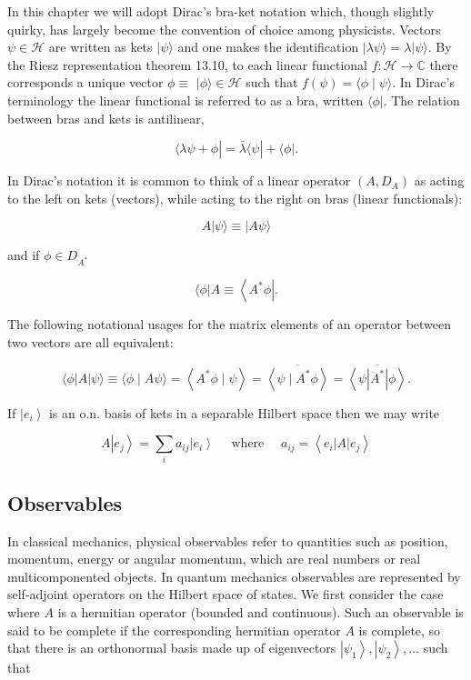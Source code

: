 \documentclass[10pt]{article}
\begin{document}
In this chapter we will adopt Dirac's bra-ket notation which, though slightly quirky, has largely become the convention of choice among physicists. Vectors $\psi \in \mathcal{H}$ are written as kets $|\psi\rangle$ and one makes the identification $|\lambda \psi\rangle=\lambda|\psi\rangle$. By the Riesz representation theorem 13.10, to each linear functional $f: \mathcal{H} \rightarrow \mathbb{C}$ there corresponds a unique vector $\phi \equiv$ $|\phi\rangle \in \mathcal{H}$ such that $f(\psi)=\langle\phi \mid \psi\rangle$. In Dirac's terminology the linear functional is referred to as a bra, written $\langle\phi|$. The relation between bras and kets is antilinear,

$$
\langle\lambda \psi+\phi|=\bar{\lambda}\langle\psi|+\langle\phi| .
$$

In Dirac's notation it is common to think of a linear operator $\left(A, D_{A}\right)$ as acting to the left on kets (vectors), while acting to the right on bras (linear functionals):

$$
A|\psi\rangle \equiv|A \psi\rangle
$$

and if $\phi \in D_{A^{*}}$

$$
\langle\phi| A \equiv\left\langle A^{*} \phi\right| .
$$

The following notational usages for the matrix elements of an operator between two vectors are all equivalent:

$$
\langle\phi|A| \psi\rangle \equiv\langle\phi \mid A \psi\rangle=\left\langle A^{*} \phi \mid \psi\right\rangle=\overline{\left\langle\psi \mid A^{*} \phi\right\rangle}=\overline{\left\langle\psi\left|A^{*}\right| \phi\right\rangle} .
$$

If $\left|e_{i}\right\rangle$ is an o.n. basis of kets in a separable Hilbert space then we may write

$$
A\left|e_{j}\right\rangle=\sum_{i} a_{i j}\left|e_{i}\right\rangle \quad \text { where } \quad a_{i j}=\left\langle e_{i}|A| e_{j}\right\rangle
$$

\subsection{Observables}
In classical mechanics, physical observables refer to quantities such as position, momentum, energy or angular momentum, which are real numbers or real multicomponented objects. In quantum mechanics observables are represented by self-adjoint operators on the Hilbert space of states. We first consider the case where $A$ is a hermitian operator (bounded and continuous). Such an observable is said to be complete if the corresponding hermitian operator $A$ is complete, so that there is an orthonormal basis made up of eigenvectors $\left|\psi_{1}\right\rangle,\left|\psi_{2}\right\rangle, \ldots$ such that
\end{document}
